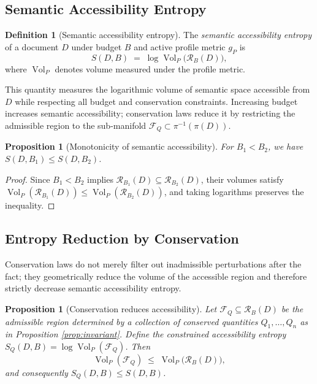 \documentclass[12pt, a4paper]{article}
\theoremstyle{plain}
\newtheorem{proposition}[theorem]{Proposition}
\theoremstyle{definition}
\newtheorem{definition}[theorem]{Definition}
\theoremstyle{remark}
\newcommand{\calF}{\mathcal{F}}
\newcommand{\calR}{\mathcal{R}}
\newcommand{\vpi}{\pi}
\newcommand{\fiber}[1]{\vpi^{-1}(#1)}
\begin{document}
\subsection{Semantic Accessibility Entropy}

\begin{definition}[Semantic accessibility entropy]
\label{def:entropy}
The \emph{semantic accessibility entropy} of a document $D$ under budget $B$
and active profile metric $g_P$ is
\[
   S(D, B) \;=\; \log \operatorname{Vol}_P\!\bigl(\calR_B(D)\bigr),
\]
where $\operatorname{Vol}_P$ denotes volume measured under the profile metric.
\end{definition}

This quantity measures the logarithmic volume of semantic space accessible from
$D$ while respecting all budget and conservation constraints.  Increasing budget
increases semantic accessibility; conservation laws reduce it by restricting the
admissible region to the sub-manifold $\calF_Q \subset \fiber{\vpi(D)}$.

\begin{proposition}[Monotonicity of semantic accessibility]
\label{prop:entropy}
For $B_1 < B_2$, we have $S(D, B_1) \le S(D, B_2)$.
\end{proposition}

\begin{proof}
Since $B_1 < B_2$ implies $\calR_{B_1}(D) \subseteq \calR_{B_2}(D)$,
their volumes satisfy
$\operatorname{Vol}_P(\calR_{B_1}(D)) \le \operatorname{Vol}_P(\calR_{B_2}(D))$,
and taking logarithms preserves the inequality.
\end{proof}

\subsection{Entropy Reduction by Conservation}

Conservation laws do not merely filter out inadmissible perturbations after the
fact; they geometrically reduce the volume of the accessible region and therefore
strictly decrease semantic accessibility entropy.

\begin{proposition}[Conservation reduces accessibility]
\label{prop:conservation_entropy}
Let $\calF_Q \subseteq \calR_B(D)$ be the admissible region determined by a
collection of conserved quantities $Q_1, \ldots, Q_n$ as in Proposition
\ref{prop:invariant}.  Define the \emph{constrained accessibility entropy}
$S_Q(D, B) = \log \operatorname{Vol}_P(\calF_Q)$.  Then
\[
   \operatorname{Vol}_P(\calF_Q) \;\le\; \operatorname{Vol}_P\!\bigl(\calR_B(D)\bigr),
\]
and consequently $S_Q(D, B) \le S(D, B)$.
\end{proposition}
\end{document}

